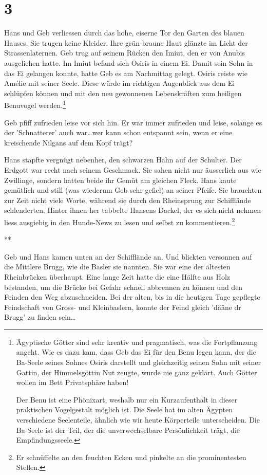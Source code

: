 \documentclass[11pt,titlepage,a5paper]{book}
\newcommand{\sterne}{\par{\centering ***\par}}
\begin{document}
\section*{3}

Hans und Geb verliessen durch das hohe, eiserne Tor den Garten des blauen Hauses. Sie trugen keine Kleider. Ihre grün-braune Haut glänzte im Licht der Strassenlaternen. Geb trug auf seinem Rücken den Imiut, den er von Anubis ausgeliehen hatte. Im Imiut befand sich Osiris in einem Ei. Damit sein Sohn in das Ei gelangen konnte, hatte Geb es am Nachmittag gelegt. Osiris reiste wie Amélie mit seiner Seele. Diese würde im richtigen Augenblick aus dem Ei schlüpfen können und mit den neu gewonnenen Lebenskräften zum heiligen Benuvogel werden.\footnote{Ägyptische Götter sind sehr kreativ und pragmatisch, was die Fortpflanzung angeht. Wie es dazu kam, dass Geb das Ei für den Benu legen kann, der die Ba-Seele seines Sohnes Osiris darstellt und gleichzeitig seinen Sohn mit seiner Gattin, der Himmelsgöttin Nut zeugte, wurde nie ganz geklärt. Auch Götter wollen im Bett Privatsphäre haben!

Der Benu ist eine Phönixart, weshalb nur ein Kurzaufenthalt in dieser praktischen Vogelgestalt möglich ist. Die Seele hat im alten Ägypten verschiedene Seelenteile, ähnlich wie wir heute Körperteile unterscheiden. Die Ba-Seele ist der Teil, der die unverwechselbare Persönlichkeit trägt, die Empfindungsseele.}

Geb pfiff zufrieden leise vor sich hin. Er war immer zufrieden und leise, solange es der 'Schnatterer' auch war\dots wer kann schon entspannt sein, wenn er eine kreischende Nilgans auf dem Kopf trägt?
 
Hans stapfte vergnügt nebenher, den schwarzen Hahn auf der Schulter. Der Erdgott war recht nach seinem Geschmack. Sie sahen nicht nur äusserlich aus wie Zwillinge, sondern hatten beide ihr Gemüt am gleichen Fleck. Hans kaute gemütlich und still (was wiederum Geb sehr gefiel) an seiner Pfeife. Sie brauchten zur Zeit nicht viele Worte, während sie durch den Rheinsprung zur Schifflände schlenderten. Hinter ihnen her tabbelte Hansens Dackel, der es sich nicht nehmen liess ausgiebig in den Hunde-News zu lesen und selbst zu kommentieren.\footnote{Er schnüffelte an den feuchten Ecken und pinkelte an die prominentesten Stellen.}
 
\sterne

Geb  und Hans kamen unten an der Schifflände an. Und blickten versonnen auf die Mittlere Brugg, wie die Basler sie nannten. Sie war eine der ältesten Rheinbrücken überhaupt. Eine lange Zeit hatte die eine Hälfte aus Holz bestanden, um die Brücke bei Gefahr schnell abbrennen zu können und den Feinden den Weg abzuschneiden. Bei der alten, bis in die heutigen Tage gepflegte Feindschaft von Gross- und Kleinbaslern, konnte der Feind gleich 'dääne dr Brugg' zu finden sein\dots
\end{document}
